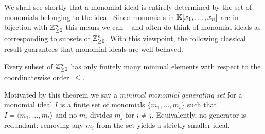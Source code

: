 \documentclass[12pt,reqno]{amsart}
\begin{document}
We shall see shortly that a monomial ideal is entirely determined by the set of monomials belonging to the ideal. Since monomials in $\mathbb{K}[x_1,\ldots, x_n]$ are in bijection with $\mathbb{Z}^{n}_{\geq0}$ this means we can -- and often do think of monomial ideals as corresponding to subsets of $\mathbb{Z}^{n}_{\geq0}$. With this viewpoint, the following classical result guarantees that monomial ideals are well-behaved.

\begin{theorem}\label{thm:dickson}
Every subset of $\mathbb{Z}_{\geq0}^n$ has only finitely many minimal elements with respect to the coordinatewise order~$\leq$. 
\end{theorem}

Motivated by this theorem we say a \emph{minimal monomial generating set} for a monomial ideal $I$ is a finite set of monomials $\{m_1,\ldots,m_t\}$ such that $I=\langle m_1,\ldots,m_t\rangle$ and no $m_i$ divides $m_j$ for $i\neq j$. Equivalently, no generator is redundant: removing any $m_i$ from the set yields a strictly smaller ideal. 

\hrulefill
\end{document}
